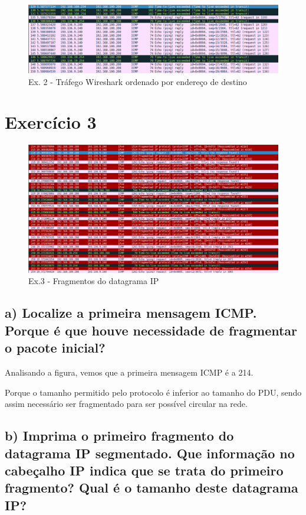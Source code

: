 \documentclass[a4paper]{report}
\begin{document}
\begin{figure}[H]
    \centering 
    \includegraphics[width=\textwidth]{images/wiresharkDestinyEx2.png}
    \caption{Ex. 2 - Tráfego Wireshark ordenado por endereço de destino}
    \label{fig:wiresharkDestinyEx2}
\end{figure}

\pagebreak
\section{Exercício 3}

\begin{figure}[H]
    \centering 
    \includegraphics[width=\textwidth]{images/datagramaIpEx3.png}
    \caption{Ex.3 - Fragmentos do datagrama IP}
    \label{fig:datagramaIpEx3}
\end{figure}

\subsection{a) Localize a primeira mensagem ICMP. Porque é que houve 
necessidade de fragmentar o pacote inicial?}

Analisando a figura, vemos que a primeira mensagem ICMP é a 214.

Porque o tamanho permitido pelo protocolo é inferior ao tamanho do PDU, sendo assim
necessário ser fragmentado para ser possível circular na rede.

\subsection{b) Imprima o primeiro fragmento do datagrama IP segmentado. 
Que informação no cabeçalho IP indica que se trata do primeiro fragmento? 
Qual é o tamanho deste datagrama IP?}
\end{document}
